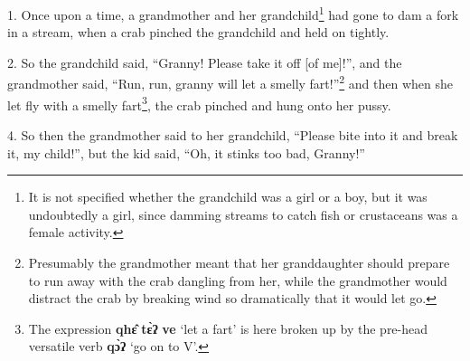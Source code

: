 \setcounter{footnote}{0}

1. Once upon a time, a grandmother and her grandchild\footnote{It is not specified whether the grandchild was a girl or a boy, but it was undoubtedly a girl, since damming streams to catch fish or crustaceans was a female activity.} had gone to dam a fork
in a stream, when a crab pinched the grandchild and held on tightly.

2. So the grandchild said, ``Granny! Please take it off [of me]!'', and the grandmother
said, ``Run, run, granny will let a smelly fart!''\footnote{Presumably the grandmother meant that her granddaughter should prepare to run away with the crab dangling from her, while the grandmother would distract the crab by breaking wind so dramatically that it would let go.} and then when she let fly
with a smelly fart\footnote{The expression \textbf{qhɛ̂} \textbf{tɛ̀ʔ} \textbf{ve} `let a fart' is here broken up by the pre-head versatile verb \textbf{qɔ̀ʔ} `go on to V'.}, the crab pinched and hung onto her pussy.

4. So then the grandmother said to her grandchild, ``Please bite into it and break
it, my child!'', but the kid said, ``Oh, it stinks too bad, Granny!''

